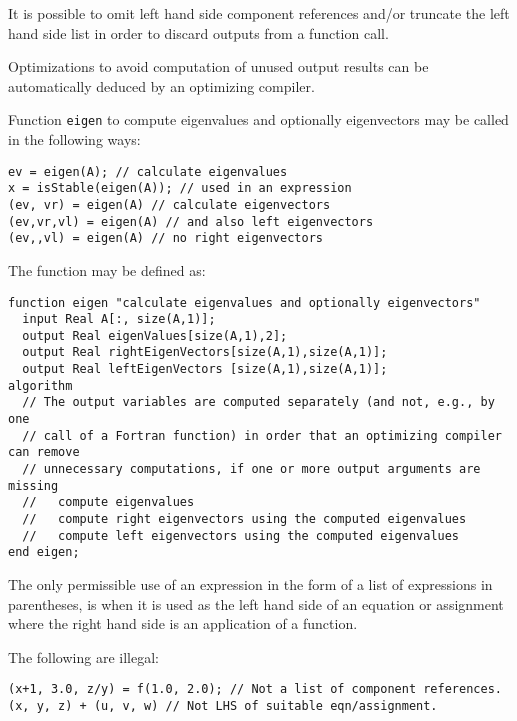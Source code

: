 It is possible to omit left hand side component references and/or
truncate the left hand side list in order to discard outputs from a
function call.

\begin{nonnormative}
Optimizations to avoid computation of unused output results can
be automatically deduced by an optimizing compiler.
\end{nonnormative}

\begin{example}
Function \lstinline!eigen! to compute eigenvalues and optionally
eigenvectors may be called in the following ways:
\begin{lstlisting}[language=modelica]
ev = eigen(A); // calculate eigenvalues
x = isStable(eigen(A)); // used in an expression
(ev, vr) = eigen(A) // calculate eigenvectors
(ev,vr,vl) = eigen(A) // and also left eigenvectors
(ev,,vl) = eigen(A) // no right eigenvectors
\end{lstlisting}
The function may be defined as:
\begin{lstlisting}[language=modelica]
function eigen "calculate eigenvalues and optionally eigenvectors"
  input Real A[:, size(A,1)];
  output Real eigenValues[size(A,1),2];
  output Real rightEigenVectors[size(A,1),size(A,1)];
  output Real leftEigenVectors [size(A,1),size(A,1)];
algorithm
  // The output variables are computed separately (and not, e.g., by one
  // call of a Fortran function) in order that an optimizing compiler can remove
  // unnecessary computations, if one or more output arguments are missing
  //   compute eigenvalues
  //   compute right eigenvectors using the computed eigenvalues
  //   compute left eigenvectors using the computed eigenvalues
end eigen;
\end{lstlisting}
\end{example}

The only permissible use of an expression in the form of a list of
expressions in parentheses, is when it is used as the left hand side of
an equation or assignment where the right hand side is an application of
a function.

\begin{example}
The following are illegal:
\begin{lstlisting}[language=modelica]
(x+1, 3.0, z/y) = f(1.0, 2.0); // Not a list of component references.
(x, y, z) + (u, v, w) // Not LHS of suitable eqn/assignment.
\end{lstlisting}
\end{example}

